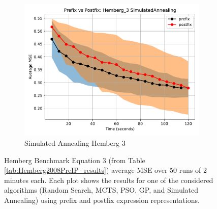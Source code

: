 \documentclass[12pt]{iopart}
\begin{document}
\begin{figure}
    \vspace{0.5cm}
    
    \begin{subfigure}[b]{0.4\textwidth}
        \includegraphics[width=\linewidth, keepaspectratio]{Hemberg_Benchmarks/PrePostHemberg_3SimulatedAnnealing.pdf}
        \caption{Simulated Annealing Hemberg 3}
        \label{subfig:hemberg_3_SA}
    \end{subfigure}
    
    \caption{Hemberg Benchmark Equation 3 (from Table \ref{tab:Hemberg2008PreIP_results}) average MSE over 50 runs of 2 minutes each. Each plot shows the results for one of the considered algorithms (Random Search, MCTS, PSO, GP, and Simulated Annealing) using prefix and postfix expression representations.}
    \label{fig:Hemberg_3_Benchmarks}
\end{figure}
\end{document}
